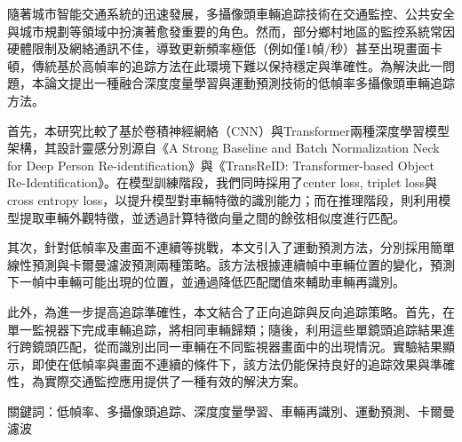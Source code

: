\begin{abstractzh}

隨著城市智能交通系統的迅速發展，多攝像頭車輛追踪技術在交通監控、公共安全與城市規劃等領域中扮演著愈發重要的角色。然而，部分鄉村地區的監控系統常因硬體限制及網絡通訊不佳，導致更新頻率極低（例如僅1幀/秒）甚至出現畫面卡頓，傳統基於高幀率的追踪方法在此環境下難以保持穩定與準確性。為解決此一問題，本論文提出一種融合深度度量學習與運動預測技術的低幀率多攝像頭車輛追踪方法。

首先，本研究比較了基於卷積神經網絡（CNN）與Transformer兩種深度學習模型架構，其設計靈感分別源自《A Strong Baseline and Batch Normalization Neck for Deep Person Re-identification》與《TransReID: Transformer-based Object Re-Identification》。在模型訓練階段，我們同時採用了center loss, triplet loss與cross entropy loss，以提升模型對車輛特徵的識別能力；而在推理階段，則利用模型提取車輛外觀特徵，並透過計算特徵向量之間的餘弦相似度進行匹配。

其次，針對低幀率及畫面不連續等挑戰，本文引入了運動預測方法，分別採用簡單線性預測與卡爾曼濾波預測兩種策略。該方法根據連續幀中車輛位置的變化，預測下一幀中車輛可能出現的位置，並通過降低匹配閾值來輔助車輛再識別。

此外，為進一步提高追踪準確性，本文結合了正向追踪與反向追踪策略。首先，在單一監視器下完成車輛追踪，將相同車輛歸類；隨後，利用這些單鏡頭追踪結果進行跨鏡頭匹配，從而識別出同一車輛在不同監視器畫面中的出現情況。實驗結果顯示，即使在低幀率與畫面不連續的條件下，該方法仍能保持良好的追踪效果與準確性，為實際交通監控應用提供了一種有效的解決方案。

\vspace{17cm}

關鍵詞：低幀率、多攝像頭追踪、深度度量學習、車輛再識別、運動預測、卡爾曼濾波

\end{abstractzh}